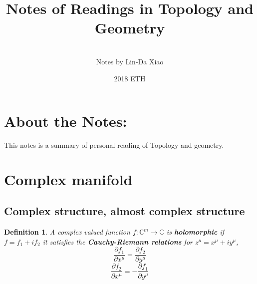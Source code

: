 \documentclass[11pt]{article}
\title{\bf Notes of Readings in Topology and Geometry}
\author{\\
Notes by Lin-Da Xiao}
\date{2018 ETH} %
\newtheorem{dfn}[thm]{Definition}
\newcommand{\cplx}{\mathbb C}
\newcommand{\pd}{{\partial}}
\newcommand{\lrta}{\longrightarrow}
\begin{document}
\maketitle
\tableofcontents
\newpage

\section*{About the Notes:}
This notes is a summary of personal reading  of Topology and geometry.
\section{Complex manifold}
\subsection{Complex structure, almost complex structure}
\begin{dfn}
A complex valued function $f:\cplx^m\lrta\cplx$ is \textbf{holomorphic} if  $f=f_1+i f_2$ it satisfies the \textbf{Cauchy-Riemann relations} for $z^\mu=x^\mu+i y^\mu$,
$$
\frac{\pd f_1}{\pd x^\mu}=\frac{\pd f_2}{\pd y^{\mu}}
$$
$$
\frac{\pd f_2}{\pd x^\mu}=-\frac{\pd f_1}{\pd y^{\mu}}
$$
\end{dfn}
\end{document}
